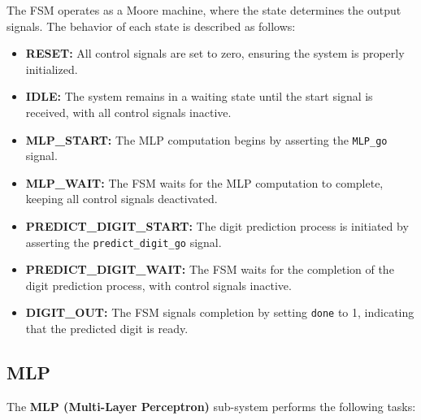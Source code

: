 \documentclass[11pt]{report}
\begin{document}
The FSM operates as a Moore machine, where the state determines the output signals. The behavior of each state is described as follows:

\begin{itemize}
    \item \textbf{RESET:} All control signals are set to zero, ensuring the system is properly initialized.
    \item \textbf{IDLE:} The system remains in a waiting state until the start signal is received, with all control signals inactive.
    \item \textbf{MLP\_START:} The MLP computation begins by asserting the \texttt{MLP\_go} signal.
    \item \textbf{MLP\_WAIT:} The FSM waits for the MLP computation to complete, keeping all control signals deactivated.
    \item \textbf{PREDICT\_DIGIT\_START:} The digit prediction process is initiated by asserting the \texttt{predict\_digit\_go} signal.
    \item \textbf{PREDICT\_DIGIT\_WAIT:} The FSM waits for the completion of the digit prediction process, with control signals inactive.
    \item \textbf{DIGIT\_OUT:} The FSM signals completion by setting \texttt{done} to 1, indicating that the predicted digit is ready.
\end{itemize}


\subsection{MLP}

The \textbf{MLP (Multi-Layer Perceptron)} sub-system performs the following tasks:
\end{document}
